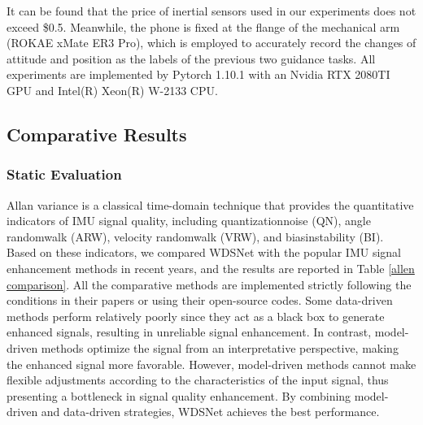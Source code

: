 \documentclass[letterpaper]{article}
\begin{document}
	It can be found that the price of inertial sensors used in our experiments does not exceed \$0.5.
	Meanwhile, the phone is fixed at the flange of the mechanical arm (ROKAE xMate ER3 Pro), which is employed to accurately record the changes of attitude and position as the labels of the previous two guidance tasks.
	All experiments are implemented by Pytorch 1.10.1 with an Nvidia RTX 2080TI GPU and Intel(R) Xeon(R) W-2133 CPU.

	\subsection{Comparative Results}
	\subsubsection{Static Evaluation}
	Allan variance is a classical time-domain technique that provides the quantitative indicators of IMU signal quality, including quantizationnoise (QN), angle randomwalk (ARW), velocity randomwalk (VRW), and biasinstability (BI).
	Based on these indicators, we compared WDSNet with the popular IMU signal enhancement methods in recent years, and the results are reported in Table \ref{allen comparison}.
	All the comparative methods are implemented strictly following the conditions in their papers or using their open-source codes.
	Some data-driven methods perform relatively poorly since they act as a black box to generate enhanced signals, resulting in unreliable signal enhancement. In contrast, model-driven methods optimize the signal from an interpretative perspective, making the enhanced signal more favorable. However, model-driven methods cannot make flexible adjustments according to the characteristics of the input signal, thus presenting a bottleneck in signal quality enhancement.
	By combining model-driven and data-driven strategies, WDSNet achieves the best performance.
\end{document}
